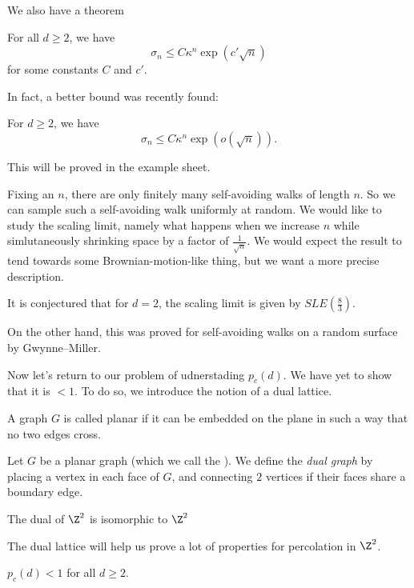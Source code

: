 \documentclass[a4paper]{article}
\begin{document}
We also have a theorem
\begin{thm}
  For all $d \geq 2$, we have
  \[
    \sigma_n \leq C \kappa^n \exp(c' \sqrt{n})
  \]
  for some constants $C$ and $c'$.
\end{thm}

In fact, a better bound was recently found:
\begin{thm}[Hutchcroft]
  For $d \geq 2$, we have
  \[
     \sigma_n \leq C \kappa^n \exp(o(\sqrt{n})).
  \]
\end{thm}
This will be proved in the example sheet. %

Fixing an $n$, there are only finitely many self-avoiding walks of length $n$. So we can sample such a self-avoiding walk uniformly at random. We would like to study the scaling limit, namely what happens when we increase $n$ while simlutaneously shrinking space by a factor of $\frac{1}{\sqrt{n}}$. We would expect the result to tend towards some Brownian-motion-like thing, but we want a more precise description.

It is conjectured that for $d = 2$, the scaling limit is given by $SLE(\frac{8}{3})$.

On the other hand, this was proved for self-avoiding walks on a random surface by Gwynne--Miller. %

Now let's return to our problem of udnerstading $p_c(d)$. We have yet to show that it is $ < 1$. To do so, we introduce the notion of a dual lattice.

\begin{defi}
  A graph $G$ is called planar if it can be embedded on the plane in such a way that no two edges cross.
\end{defi}

\begin{defi}
  Let $G$ be a planar graph (which we call the ). We define the \emph{dual graph} by placing a vertex in each face of $G$, and connecting $2$ vertices if their faces share a boundary edge.
\end{defi}

\begin{eg}
  The dual of $\Z^2$ is isomorphic to $\Z^2$ %
\end{eg}
The dual lattice will help us prove a lot of properties for percolation in $\Z^2$.

\begin{lemma}
  $p_c(d) < 1$ for all $d \geq 2$.
\end{lemma}
\end{document}
